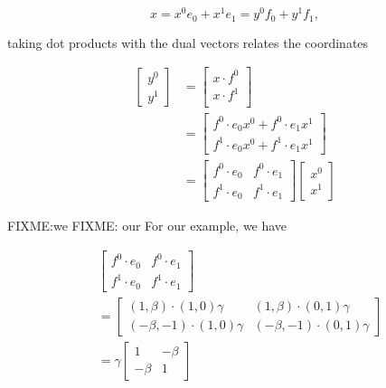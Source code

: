 \begin{equation}\label{eqn:grahamSchmidtLorentz:700}
x = x^0 e_0 + x^1 e_1 = y^0 f_0 + y^1 f_1,
\end{equation}

taking dot products with the dual vectors relates the coordinates

\begin{equation}\label{eqn:grahamSchmidtLorentz:720}
\begin{aligned}
\begin{bmatrix}
y^0 \\
y^1
\end{bmatrix}
&=
\begin{bmatrix}
x \cdot f^0 \\
x \cdot f^1 \\
\end{bmatrix} \\
&=
\begin{bmatrix}
f^0 \cdot e_0
x^0
+
f^0 \cdot e_1
x^1
\\
f^1 \cdot e_0
x^0
+
f^1 \cdot e_1
x^1
\end{bmatrix} \\
&=
\begin{bmatrix}
f^0 \cdot e_0
&
f^0 \cdot e_1
\\
f^1 \cdot e_0
 &
f^1 \cdot e_1
\end{bmatrix}
\begin{bmatrix}
x^0 \\
x^1
\end{bmatrix}
\end{aligned}
\end{equation}

FIXME:we
FIXME: our
For our example, we have

\begin{equation}\label{eqn:grahamSchmidtLorentz:740}
\begin{aligned}
&\begin{bmatrix}
f^0 \cdot e_0 & f^0 \cdot e_1 \\
f^1 \cdot e_0 & f^1 \cdot e_1
\end{bmatrix} \\
&=
\begin{bmatrix}
( 1, \beta )
\cdot
(1, 0)
\gamma &
( 1, \beta )
\cdot
(0, 1)
\gamma \\
( -\beta, -1)
\cdot
(1, 0)
\gamma &
( -\beta, -1)
\cdot
(0, 1)
\gamma
\end{bmatrix} \\
&=
\gamma
\begin{bmatrix}
1 & - \beta \\
- \beta & 1
\end{bmatrix}
\end{aligned}
\end{equation}

